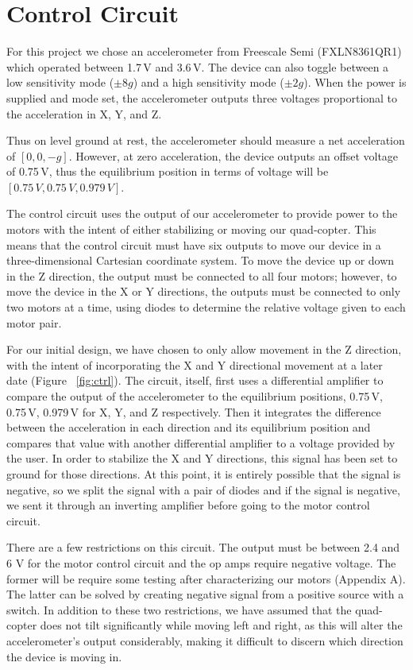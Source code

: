 \section{Control Circuit}

For this project we chose an accelerometer from Freescale Semi (FXLN8361QR1) which operated between 1.7\,V and 3.6\,V. The device can also toggle between a low sensitivity mode ($\pm8g$) and a high sensitivity mode ($\pm2g$). When the power is supplied and mode set, the accelerometer outputs three voltages proportional to the acceleration in X, Y, and Z.

Thus on level ground at rest, the accelerometer should measure a net acceleration of $[0,0,-g]$. However, at zero acceleration, the device outputs an offset voltage of 0.75\,V, thus the equilibrium position in terms of voltage will be $[0.75\,V,0.75\,V,0.979\,V]$.

The control circuit uses the output of our accelerometer to provide power to the motors with the intent of either stabilizing or moving our quad-copter. This means that the control circuit must have six outputs to move our device in a three-dimensional Cartesian coordinate system. To move the device up or down in the Z direction, the output must be connected to all four motors; however, to move the device in the X or Y directions, the outputs must be connected to only two motors at a time, using diodes to determine the relative voltage given to each motor pair. 

For our initial design, we have chosen to only allow movement in the Z direction, with the intent of incorporating the X and Y directional movement at a later date (Figure ~\ref{fig:ctrl}). The circuit, itself, first uses a differential amplifier to compare the output of the accelerometer to the equilibrium positions, 0.75\,V, 0.75\,V, 0.979\,V for X, Y, and Z respectively. Then it integrates the difference between the acceleration in each direction and its equilibrium position and compares that value with another differential amplifier to a voltage provided by the user. In order to stabilize the X and Y directions, this signal has been set to ground for those directions. At this point, it is entirely possible that the signal is negative, so we split the signal with a pair of diodes and if the signal is negative, we sent it through an inverting amplifier before going to the motor control circuit.

There are a few restrictions on this circuit. The output must be between 2.4 and 6 V for the motor control circuit and the op amps require negative voltage. The former will be require some testing after characterizing our motors (Appendix A). The latter can be solved by creating negative signal from a positive source with a switch. In addition to these two restrictions, we have assumed that the quad-copter does not tilt significantly while moving left and right, as this will alter the accelerometer's output considerably, making it difficult to discern which direction the device is moving in.

